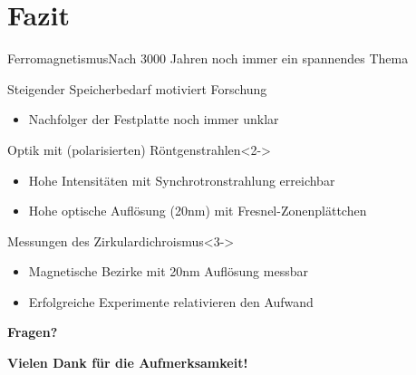 \section{Fazit}

\begin{frame}{Ferromagnetismus}{Nach 3000 Jahren noch immer ein spannendes Thema}
	\begin{block}{Steigender Speicherbedarf motiviert Forschung}
		\begin{itemize}
		  \item Nachfolger der Festplatte noch immer unklar
		\end{itemize}
	\end{block}

	\begin{block}{Optik mit (polarisierten) Röntgenstrahlen}<2->
		\begin{itemize}
		  \item Hohe Intensitäten mit Synchrotronstrahlung erreichbar
		  \item Hohe optische Auflösung (20nm) mit Fresnel-Zonenplättchen
		\end{itemize}
	\end{block}

	\begin{block}{Messungen des Zirkulardichroismus}<3->
		\begin{itemize}
		  \item Magnetische Bezirke mit 20nm Auflösung messbar
		  \item Erfolgreiche Experimente relativieren den Aufwand
		\end{itemize}
	\end{block}
\end{frame}

\begin{frame}{}{}
	\begin{center}
		\textbf{Fragen?}
	\end{center}
	\begin{center}
    	\vspace{1cm}
		\textbf{Vielen Dank für die Aufmerksamkeit!}
	\end{center}
\end{frame}